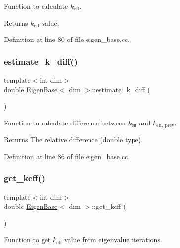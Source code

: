 Function to calculate $k_\mathrm{eff}$.

\begin{DoxyReturn}{Returns}
$k_\mathrm{eff}$ value. 
\end{DoxyReturn}


Definition at line 80 of file eigen\+\_\+base.\+cc.

\mbox{\label{class_eigen_base_ac9b7836c98e95a8be4d57b3ccf11f185}} 
\subsubsection{\texorpdfstring{estimate\+\_\+k\+\_\+diff()}{estimate\_k\_diff()}}
{\footnotesize\ttfamily template$<$int dim$>$ \\
double \hyperlink{class_eigen_base}{Eigen\+Base}$<$ dim $>$\+::estimate\+\_\+k\+\_\+diff (\begin{DoxyParamCaption}{ }\end{DoxyParamCaption})\hspace{0.3cm}{\ttfamily [protected]}}

Function to calculate difference between $k_\mathrm{eff}$ and $k_\mathrm{eff,\ prev}$.

\begin{DoxyReturn}{Returns}
The relative difference (double type). 
\end{DoxyReturn}


Definition at line 86 of file eigen\+\_\+base.\+cc.

\mbox{\label{class_eigen_base_a00569bdce088f65f71f4c743c6ec6c9b}} 
\subsubsection{\texorpdfstring{get\+\_\+keff()}{get\_keff()}}
{\footnotesize\ttfamily template$<$int dim$>$ \\
double \hyperlink{class_eigen_base}{Eigen\+Base}$<$ dim $>$\+::get\+\_\+keff (\begin{DoxyParamCaption}{ }\end{DoxyParamCaption})}

Function to get $k_\mathrm{eff}$ value from eigenvalue iterations.

